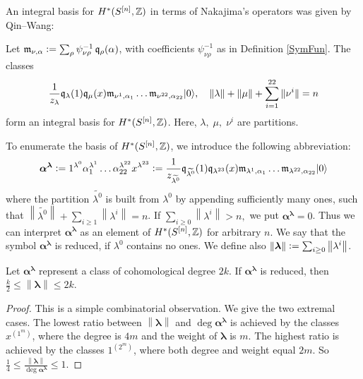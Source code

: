 An integral basis for $H^\ast(S^{[n]},\mathbb{Z})$ in terms of Nakajima's operators was given by Qin--Wang:
\begin{theorem} \label{QinWangTheorem}\cite[Thm. 5.4.]{QinWang} Let $\mathfrak{m}_{\nu,\alpha} \vcentcolon=  \sum_\rho \psi_{\nu\rho}^{-1}\,\mathfrak{q}_{\rho}(\alpha)$, with coefficients $ \psi_{\nu\rho}^{-1}$ as in Definition \ref{SymFun}. The classes
$$ \frac{1}{z_\lambda} \mathfrak{q}_\lambda(1)\mathfrak{q}_\mu(x)\mathfrak{m}_{\nu^1,\alpha_1}\ldots\mathfrak{m}_{\nu^{22},\alpha_{22}}|0\rangle,\quad \|\lambda\| +\|\mu\| + \sum_{i=1}^{22}\|\nu^i\| = n
$$ 
form an integral basis for $H^\ast(S^{[n]},\mathbb{Z})$. Here,
$\lambda,\; \mu,\; \nu^i$ are partitions.
\end{theorem}
\begin{notation}\label{notation}
To enumerate the basis of $H^\ast(S^{[n]},\mathbb{Z})$, we introduce the following abbreviation:
$$ \boldsymbol\alpha^{\boldsymbol\lambda} \vcentcolon= 
1^{\lambda^0} \alpha_1^{\lambda^1}\ldots\alpha_{22}^{\lambda^{22}}x^{\lambda^{23}} \vcentcolon= 
\frac{1}{z_{\widetilde{\lambda^0}} }
\mathfrak{q}_{\widetilde{\lambda^0}}(1)\mathfrak{q}_{\lambda^{23}}(x)\mathfrak{m}_{\lambda^1,\alpha_1}\ldots\mathfrak{m}_{\lambda^{22},\alpha_{22}}|0\rangle
$$
where the partition $\widetilde{\lambda^0}$ is built from $\lambda^0$ by appending sufficiently many ones, such that $\left\|\widetilde{\lambda^0}\right\| +\sum_{i\geq 1}\left\|\lambda^i\right\| = n $. If $\sum_{i\geq 0}\left\|\lambda^i\right\| > n, $ we put $\boldsymbol\alpha^{\boldsymbol\lambda}=0$. Thus we can interpret $\boldsymbol\alpha^{\boldsymbol\lambda}$ as an element of $H^\ast(S^{[n]},\mathbb{Z})$ for arbitrary $n$. We say that the symbol $\boldsymbol\alpha^{\boldsymbol\lambda}$ is reduced, if $\lambda^0$ contains no ones. We define also $\left\|\boldsymbol\lambda\right\| \vcentcolon=  \sum_{i\geq 0}\left\|\lambda^i\right\|$. 
\end{notation}
\begin{lemma}\label{degBound}
Let $\boldsymbol\alpha^{\boldsymbol\lambda}$ represent a class of cohomological degree $2k$. If $\boldsymbol\alpha^{\boldsymbol\lambda}$ is reduced, then $\frac{k}{2}\leq\left\|\boldsymbol{\lambda}\right\| \leq 2k$.
\begin{proof} This is a simple combinatorial observation. We give the two extremal cases.
The lowest ratio between $\left\|\boldsymbol{\lambda}\right\|$ and $\deg \boldsymbol\alpha^{\boldsymbol\lambda}$ is achieved by the classes $x^{(1^m)}$, where the degree is $4m$ and the weight of $\boldsymbol{\lambda}$ is $m$. The highest ratio is achieved by the classes $1^{(2^m)}$, where both degree and weight equal $2m$. So $\frac{1}{4}\leq\frac{\left\|\boldsymbol{\lambda}\right\|}{\deg \boldsymbol\alpha^{\boldsymbol\lambda}}\leq 1$.
\end{proof}
\end{lemma}
